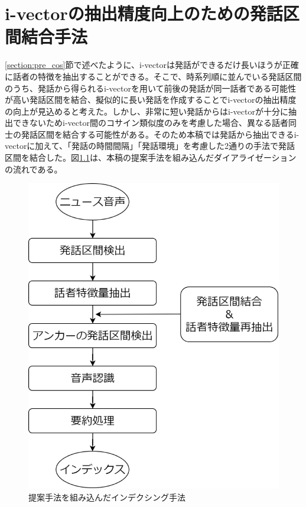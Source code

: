 \chapter{i-vectorの抽出精度向上のための発話区間結合手法}
\label{chapter:prob_method}
\ref{section:pre_cos}節で述べたように、i-vectorは発話ができるだけ長いほうが正確に話者の特徴を抽出することができる。そこで、時系列順に並んでいる発話区間のうち、発話から得られるi-vectorを用いて前後の発話が同一話者である可能性が高い発話区間を結合、擬似的に長い発話を作成することでi-vectorの抽出精度の向上が見込めると考えた。しかし、非常に短い発話からはi-vectorが十分に抽出できないためi-vector間のコサイン類似度のみを考慮した場合、異なる話者同士の発話区間を結合する可能性がある。そのため本稿では発話から抽出できるi-vectorに加えて、「発話の時間間隔」「発話環境」を考慮した2通りの手法で発話区間を結合した。図\ref{fig:indexing2}は、本稿の提案手法を組み込んだダイアライゼーションの流れである。

\begin{figure}[H]
  \begin{center}
    \includegraphics[scale=0.3]{./figure/indexing2.eps}
  \end{center}
  \caption{提案手法を組み込んだインデクシング手法 \label{fig:indexing2}}
\end{figure}

